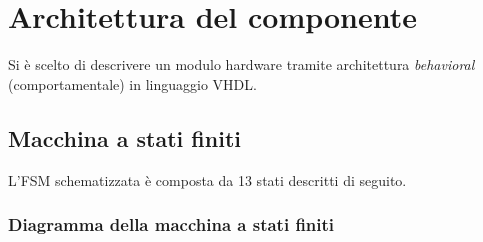 \documentclass{article}
\begin{document}
\pagebreak
\section{Architettura del componente} %
Si è scelto di descrivere un modulo hardware tramite architettura \emph{behavioral} (comportamentale) in linguaggio VHDL.

\vspace{0,2cm}

\subsection{Macchina a stati finiti} %
L’FSM schematizzata è composta da 13 stati descritti di seguito.
\subsubsection{Diagramma della macchina a stati finiti}
\end{document}
